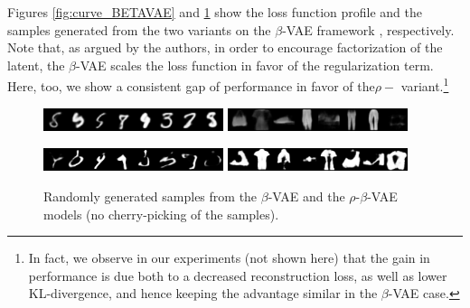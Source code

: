 \documentclass{article}
\begin{document}
Figures \ref{fig:curve_BETAVAE} and \ref{fig:pic_BETAVAE} show the loss function profile and the samples generated from the two variants on the $\beta$-VAE framework \cite{higgins2017beta}, respectively. Note that, as argued by the authors, in order to encourage factorization of the latent, the $\beta$-VAE scales the loss function in favor of the regularization term. Here, too, we show a consistent gap of performance in favor of the$\rho-$ variant.\footnote{In fact, we observe in our experiments (not shown here) that the gain in performance is due both to a decreased reconstruction loss, as well as lower KL-divergence, and hence keeping the advantage similar in the $\beta$-VAE case.}




 \begin{figure}  [!h]
   \begin{center} 
 {\includegraphics[width=0.47\textwidth]{figs/pics/generation_BETAVAE_mnist.png}} 
 {\includegraphics[width=0.47\textwidth]{figs/pics/generation_BETAVAE_fashion.png}} 

 {\includegraphics[width=0.47\textwidth]{figs/pics/generation_RHO_BETAVAE_mnist.png}} 
 {\includegraphics[width=0.47\textwidth]{figs/pics/generation_RHO_BETAVAE_fashion.png}} 

\end{center}
\vspace{-0.4cm}    
   \caption{Randomly generated samples from the $\beta$-VAE and the $\rho$-$\beta$-VAE models (no cherry-picking of the samples).}
   \label{fig:pic_BETAVAE}
   \end{figure}
\end{document}
